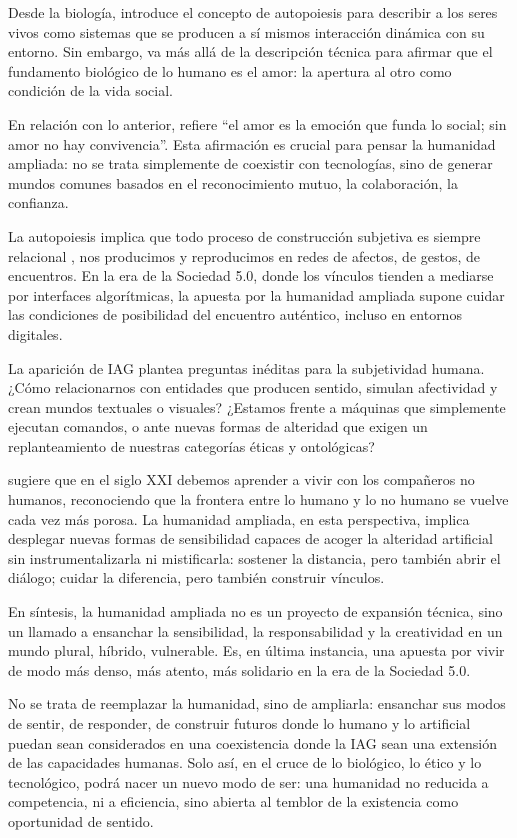 \documentclass[spanish]{textolivre}
\begin{document}
Desde la biología, \textcite{maturana1997} introduce el concepto de autopoiesis para describir a los seres vivos como sistemas que se producen a sí mismos interacción dinámica con su entorno. Sin embargo, \textcite{maturana2003} va más allá de la descripción técnica para afirmar que el fundamento biológico de lo humano es el amor: la apertura al otro como condición de la vida social.

En relación con lo anterior, \textcite[p. 38]{maturana1997} refiere “el amor es la emoción que funda lo social; sin amor no hay convivencia”. Esta afirmación es crucial para pensar la humanidad ampliada: no se trata simplemente de coexistir con tecnologías, sino de generar mundos comunes basados en el reconocimiento mutuo, la colaboración, la confianza.

La autopoiesis implica que todo proceso de construcción subjetiva es siempre relacional \cite{murillo2022}, nos producimos y reproducimos en redes de afectos, de gestos, de encuentros. En la era de la Sociedad 5.0, donde los vínculos tienden a mediarse por interfaces algorítmicas, la apuesta por la humanidad ampliada supone cuidar las condiciones de posibilidad del encuentro auténtico, incluso en entornos digitales.

La aparición de IAG plantea preguntas inéditas para la subjetividad humana. ¿Cómo relacionarnos con entidades que producen sentido, simulan afectividad y crean mundos textuales o visuales? ¿Estamos frente a máquinas que simplemente ejecutan comandos, o ante nuevas formas de alteridad que exigen un replanteamiento de nuestras categorías éticas y ontológicas?

\textcite{haraway2016} sugiere que en el siglo XXI debemos aprender a vivir con los compañeros no humanos, reconociendo que la frontera entre lo humano y lo no humano se vuelve cada vez más porosa. La humanidad ampliada, en esta perspectiva, implica desplegar nuevas formas de sensibilidad capaces de acoger la alteridad artificial sin instrumentalizarla ni mistificarla: sostener la distancia, pero también abrir el diálogo; cuidar la diferencia, pero también construir vínculos. 

En síntesis, la humanidad ampliada no es un proyecto de expansión técnica, sino un llamado a ensanchar la sensibilidad, la responsabilidad y la creatividad en un mundo plural, híbrido, vulnerable. Es, en última instancia, una apuesta por vivir de modo más denso, más atento, más solidario en la era de la Sociedad 5.0.

No se trata de reemplazar la humanidad, sino de ampliarla: ensanchar sus modos de sentir, de responder, de construir futuros donde lo humano y lo artificial puedan sean considerados en una coexistencia donde la IAG sean una extensión de las capacidades humanas. Solo así, en el cruce de lo biológico, lo ético y lo tecnológico, podrá nacer un nuevo modo de ser: una humanidad no reducida a competencia, ni a eficiencia, sino abierta al temblor de la existencia como oportunidad de sentido.
\end{document}
